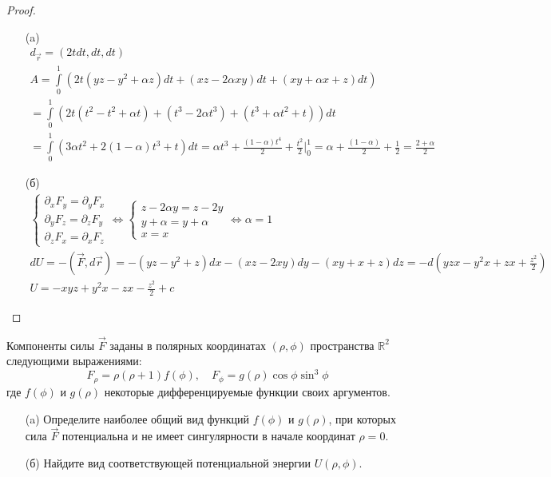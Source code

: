 \begin{proof}
\begin{itemize}
\item[]
\item[(a)]
    \begin{gather*}
        d_{\vec{r}} = \left(2tdt, dt, dt\right)\\
        A = \int\limits_{0}^{1} \left(2t\left(y z-y^2+\alpha z\right)dt + \left(x z-2 \alpha x y\right)dt + \left(x y+\alpha x+z\right)dt\right)\\
        = \int\limits_{0}^{1} \left(2t\left(t^2-t^2+\alpha t\right) + \left(t^3-2 \alpha t^3\right) + \left(t^3+\alpha t^2+t\right)\right)dt\\
        = \int\limits_{0}^{1} \left(3 \alpha t^2 + 2\left(1 - \alpha\right)t^3 + t\right)dt
        = \alpha t^3 + \frac{\left(1 - \alpha\right) t^4}{2} + \frac{t^2}{2} \bigg|_{0}^{1}
        = \alpha + \frac{\left(1 - \alpha\right)}{2} + \frac{1}{2}
        = \frac{2 + \alpha}{2}
    \end{gather*}
\item[(б)]
    \begin{gather*}
        \begin{cases}
            \partial_x F_y = \partial_y F_x\\
            \partial_y F_z = \partial_z F_y\\
            \partial_z F_x = \partial_x F_z
        \end{cases}
        \Leftrightarrow
        \begin{cases}
            z - 2 \alpha y = z - 2y\\
            y + \alpha = y + \alpha\\
            x = x
        \end{cases}
        \Leftrightarrow
        \alpha = 1\\
        d U = -\left(\vec{F}, d \vec{r}\right)
        = -\left(yz - y^2 + z\right)dx - \left(xz - 2xy\right)dy - \left(xy + x + z\right)dz
        = -d\left(yzx - y^2 x + zx + \frac{z^2}{2}\right)\\
        U = -xyz + y^2 x - zx - \frac{z^2}{2} + c
    \end{gather*}
\end{itemize}
\end{proof}
\vskip 0.6in




\begin{prob}
Компоненты силы $\vec{F}$ заданы в полярных координатах $(\rho, \phi)$ пространства $\mathbb{R}^2$ следующими выражениями:
$$
F_\rho=\rho(\rho+1) f(\phi), \quad F_\phi=g(\rho) \cos \phi \sin ^3 \phi
$$
где $f(\phi)$ и $g(\rho)$ некоторые дифференцируемые функции своих аргументов.
\begin{itemize}
\item[]
\item[(a)] Определите наиболее общий вид функций $f(\phi)$ и $g(\rho)$, при которых сила $\vec{F}$ потенциальна и не имеет сингулярности в начале координат $\rho=0$.
\item[(б)] Найдите вид соответствующей потенциальной энергии $U(\rho, \phi)$.
\end{itemize}
\end{prob}

